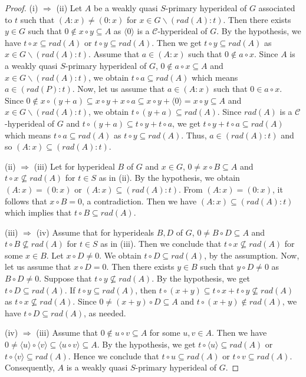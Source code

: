 \documentclass[preprint,review,10pt]{amsart}
\theoremstyle{definition}
\theoremstyle{remark}
\numberwithin{equation}{section}
\begin{document}
\begin{proof}
(i) $\Longrightarrow$ (ii) Let $A$ be a weakly quasi  $S$-primary hyperideal of $G$ associated to $t$ such that $(A:x) \neq (0:x)$ for $x \in G \backslash(rad(A) : t)$. Then there exists $y \in G$ such that $0 \notin x \circ y \subseteq A$ as $\langle 0 \rangle$ is a  $\mathcal{C}$-hyperideal of $G$. By the hypothesis, we have $t \circ x \subseteq rad(A)$ or $t \circ y \subseteq rad(A)$. Then we get $t \circ y \subseteq rad(A)$ as $x \in G \backslash(rad(A) : t)$. Assume that $a \in (A : x)$ such that $0 \notin a \circ x$. Since $A$ is a weakly quasi  $S$-primary hyperideal of $G$, $0 \notin a \circ x \subseteq A$ and  $x \in G \backslash(rad(A) : t)$, we obtain $t \circ a \subseteq rad(A)$ which means $a \in (rad(P) : t)$. Now, let us assume that $a \in (A : x)$ such that $0 \in a \circ x$. Since $0 \notin x \circ (y +a) \subseteq x \circ y + x \circ a \subseteq x \circ y +\langle 0 \rangle= x \circ y \subseteq A$ and $x \in G \backslash(rad(A) : t)$, we obtain $t \circ (y+a) \subseteq rad(A)$. Since $rad(A)$ is a $\mathcal{C}$-hyperideal of $G$ and $t \circ (y+a) \subseteq t \circ y + t \circ a$, we get $t \circ y + t \circ a \subseteq rad(A)$ which means $t \circ  a \subseteq rad(A)$ as $t \circ y \subseteq rad(A)$. Thus, $a \in (rad(A) : t)$ and so $(A:x) \subseteq (rad(A) : t)$.

(ii) $\Longrightarrow$ (iii) Let for hyperideal  $B$ of $G$ and $x \in G$, $0 \neq x \circ B \subseteq A$ and $t \circ x \nsubseteq rad(A)$ for $t \in S$ as in (ii). By the hypothesis, we obtain $(A:x)=(0:x)$ or $(A:x) \subseteq (rad(A) : t)$. From  $(A:x)=(0:x)$, it follows that $x \circ B =0$, a contradiction. Then we have $(A:x) \subseteq (rad(A) : t)$ which implies that $t \circ B \subseteq rad(A)$. 

(iii) $\Longrightarrow$ (iv) Assume that for hyperideals  $B,D$ of $G$, $0 \neq B \circ D \subseteq A$ and  $t \circ B \nsubseteq rad(A)$ for $t \in S$ as in (iii). Then we conclude that $t \circ x \nsubseteq rad(A)$ for some $x \in B$.  Let $x \circ D \neq 0$. We obtain $t \circ D \subseteq rad(A)$, by the assumption. Now, let us assume that $x \circ D=0$. Then there exists $y \in B$ such that $y \circ D \neq 0$ as $B \circ D \neq 0$. Suppose that $t \circ y \nsubseteq rad(A)$. By the hypothesis, we get  $t \circ D \subseteq rad(A)$. If $t \circ y \subseteq rad(A)$, then $t \circ (x+y) \subseteq t \circ x + t \circ y \nsubseteq rad(A)$ as $t \circ x \nsubseteq rad(A)$. Since $0 \neq (x+y) \circ D \subseteq A$ and $t \circ (x+y) \notin rad(A)$, we have $t \circ D \subseteq rad(A)$, as needed.

(iv) $\Longrightarrow$ (iii) Assume that $0 \notin u \circ v \subseteq A$ for some $u,v \in A$. Then we have $0 \neq \langle u \rangle  \circ \langle v \rangle \subseteq \langle u \circ v  \rangle \subseteq A$. By the hypothesis, we get $t \circ \langle u \rangle \subseteq rad(A)$ or $t \circ \langle v  \rangle \subseteq rad(A)$. Hence we conclude that $t \circ u \subseteq rad(A)$ or $t \circ v \subseteq rad(A)$. Consequently, $A$ is a weakly quasi  $S$-primary hyperideal of $G$.
\end{proof}
\end{document}
